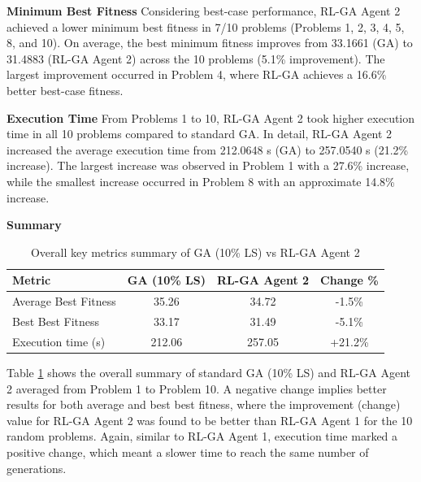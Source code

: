 \documentclass{article}
\begin{document}
\textbf{Minimum Best Fitness} \newline
Considering best-case performance, RL-GA Agent 2 achieved a lower minimum best fitness in 7/10 problems (Problems 1, 2, 3, 4, 5, 8, and 10). On average, the best minimum fitness improves from 33.1661 (GA) to 31.4883 (RL-GA Agent 2) across the 10 problems (5.1\% improvement). The largest improvement occurred in Problem 4, where RL-GA achieves a 16.6\% better best-case fitness.

\textbf{Execution Time} \newline
From Problems 1 to 10, RL-GA Agent 2 took higher execution time in all 10 problems compared to standard GA. In detail, RL-GA Agent 2 increased the average execution time from 212.0648 s (GA) to 257.0540 s (21.2\% increase). The largest increase was observed in Problem 1 with a 27.6\% increase, while the smallest increase occurred in Problem 8 with an approximate 14.8\% increase.

\textbf{Summary} \newline
\begin{table}[H]
\centering
\small
\begin{tabular}{lccc}
\toprule
\textbf{Metric} & \textbf{GA (10\% LS)} & \textbf{RL-GA Agent 2} & \textbf{Change \%} \\
\midrule
Average Best Fitness & 35.26 & 34.72 & -1.5\% \\
Best Best Fitness & 33.17 & 31.49 & -5.1\% \\
Execution time (s) & 212.06 & 257.05 & +21.2\% \\
\bottomrule
\end{tabular}
\caption{Overall key metrics summary of GA (10\% LS) vs RL-GA Agent 2}
\label{tab:overall_summary_10}
\end{table}

Table \ref{tab:overall_summary_10} shows the overall summary of standard GA (10\% LS) and RL-GA Agent 2 averaged from Problem 1 to Problem 10. A negative change implies better results for both average and best best fitness, where the improvement (change) value for RL-GA Agent 2 was found to be better than RL-GA Agent 1 for the 10 random problems. Again, similar to RL-GA Agent 1, execution time marked a positive change, which meant a slower time to reach the same number of generations.
\end{document}
